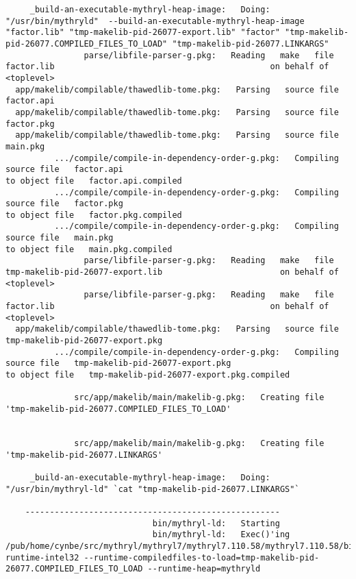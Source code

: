 \begin{verbatim}
     _build-an-executable-mythryl-heap-image:   Doing:                  "/usr/bin/mythryld"  --build-an-executable-mythryl-heap-image  "factor.lib" "tmp-makelib-pid-26077-export.lib" "factor" "tmp-makelib-pid-26077.COMPILED_FILES_TO_LOAD" "tmp-makelib-pid-26077.LINKARGS"
                parse/libfile-parser-g.pkg:   Reading   make   file   factor.lib                                            on behalf of <toplevel>
  app/makelib/compilable/thawedlib-tome.pkg:   Parsing   source file   factor.api
  app/makelib/compilable/thawedlib-tome.pkg:   Parsing   source file   factor.pkg
  app/makelib/compilable/thawedlib-tome.pkg:   Parsing   source file   main.pkg
          .../compile/compile-in-dependency-order-g.pkg:   Compiling source file   factor.api                                              to object file   factor.api.compiled
          .../compile/compile-in-dependency-order-g.pkg:   Compiling source file   factor.pkg                                              to object file   factor.pkg.compiled
          .../compile/compile-in-dependency-order-g.pkg:   Compiling source file   main.pkg                                                to object file   main.pkg.compiled
                parse/libfile-parser-g.pkg:   Reading   make   file   tmp-makelib-pid-26077-export.lib                        on behalf of <toplevel>
                parse/libfile-parser-g.pkg:   Reading   make   file   factor.lib                                            on behalf of <toplevel>
  app/makelib/compilable/thawedlib-tome.pkg:   Parsing   source file   tmp-makelib-pid-26077-export.pkg
          .../compile/compile-in-dependency-order-g.pkg:   Compiling source file   tmp-makelib-pid-26077-export.pkg                          to object file   tmp-makelib-pid-26077-export.pkg.compiled

              src/app/makelib/main/makelib-g.pkg:   Creating file 'tmp-makelib-pid-26077.COMPILED_FILES_TO_LOAD'


              src/app/makelib/main/makelib-g.pkg:   Creating file 'tmp-makelib-pid-26077.LINKARGS'

     _build-an-executable-mythryl-heap-image:   Doing:                        "/usr/bin/mythryl-ld" `cat "tmp-makelib-pid-26077.LINKARGS"`

    ----------------------------------------------------
                              bin/mythryl-ld:   Starting
                              bin/mythryl-ld:   Exec()'ing                              /pub/home/cynbe/src/mythryl/mythryl7/mythryl7.110.58/mythryl7.110.58/bin/mythryl-runtime-intel32 --runtime-compiledfiles-to-load=tmp-makelib-pid-26077.COMPILED_FILES_TO_LOAD --runtime-heap=mythryld 


\end{verbatim}
